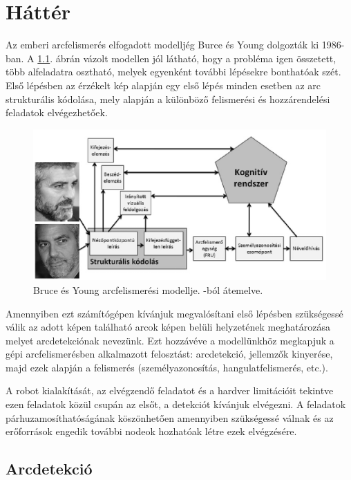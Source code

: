 \chapter{Háttér}
Az emberi arcfelismerés elfogadott modelljég Burce és Young \cite{bruce_understanding_1986} dolgozták ki 1986-ban. A \ref{Bruce_and_Young_face_recognition_model}. ábrán vázolt modellen jól látható, hogy a probléma igen összetett, több alfeladatra osztható, melyek egyenként további lépésekre bonthatóak szét. Első lépésben az érzékelt kép alapján egy első lépés minden esetben az arc strukturális kódolása, mely alapján a különböző felismerési és hozzárendelési feladatok elvégezhetőek.

\begin{figure}
    \centering
    \includegraphics[width=\linewidth]{figures/bruce-young.png}
    \caption{Bruce és Young arcfelismerési modellje. \cite{kornel_az_2015}-ból átemelve.}
    \label{Bruce_and_Young_face_recognition_model}
\end{figure}

Amennyiben ezt számítógépen kívánjuk megvalósítani első lépésben szükségessé válik az adott képen található arcok képen belüli helyzetének meghatározása melyet arcdetekciónak nevezünk. Ezt hozzávéve a modellünkhöz megkapjuk a gépi arcfelismerésben alkalmazott felosztást: arcdetekció, jellemzők kinyerése, majd ezek alapján a felismerés (személyazonosítás, hangulatfelismerés, etc.).

A robot kialakítását, az elvégzendő feladatot és a hardver limitációit tekintve ezen feladatok közül csupán az elsőt, a detekciót kívánjuk elvégezni. A feladatok párhuzamosíthatóságának köszönhetően amennyiben szükségessé válnak és az erőforrások engedik további nodeok hozhatóak létre ezek elvégzésére.

\section{Arcdetekció}

